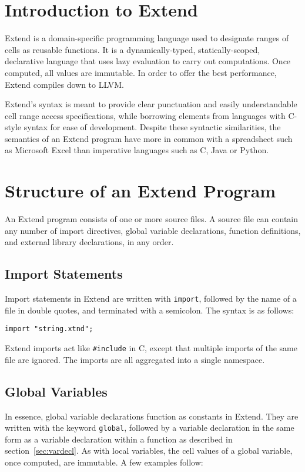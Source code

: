 \section{Introduction to Extend}
	Extend is a domain-specific programming language used to designate ranges of cells as reusable functions. It is a dynamically-typed, statically-scoped, declarative language that uses lazy evaluation to carry out computations. Once computed, all values are immutable. In order to offer the best performance, Extend compiles down to LLVM.

	Extend's syntax is meant to provide clear punctuation and easily understandable cell range access specifications, while borrowing elements from languages with C-style syntax for ease of development. Despite these syntactic similarities, the semantics of an Extend program have more in common with a spreadsheet such as Microsoft Excel than imperative languages such as C, Java or Python.

\section{Structure of an Extend Program}
\label{sec:Grammar}
	An Extend program consists of one or more source files. A source file can contain any number of import directives, global variable declarations, function definitions, and external library declarations, in any order.
	\subsection{Import Statements}
		Import statements in Extend are written with \texttt{import}, followed by the name of a file in double quotes, and terminated with a semicolon. The syntax is as follows:
		\begin{lstlisting}
import "string.xtnd";
		\end{lstlisting}
		Extend imports act like \texttt{\#include} in C, except that multiple imports of the same file are ignored. The imports are all aggregated into a single namespace.
	\subsection{Global Variables}
		In essence, global variable declarations function as constants in Extend. They are written with the keyword \texttt{global}, followed by a variable declaration in the same form as a variable declaration within a function as described in section~\ref{sec:vardecl}. As with local variables, the cell values of a global variable, once computed, are immutable. A few examples follow:
		

